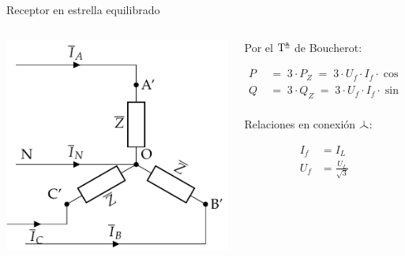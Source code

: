 \documentclass[aspectratio=169, usenames,svgnames,dvipsnames]{beamer}
\newcommand\wye{\scalerel*{\stackengine{-1pt}{%
  \rotatebox[origin=c]{30}{\rule{10pt}{.9pt}}\kern-1pt%
  \rotatebox[origin=c]{-30}{\rule{10pt}{1.3pt}}}{%
  \rule{.9pt}{10pt}}{O}{c}{F}{F}{S}}{\Delta}} %
\begin{document}

\begin{frame}{Receptor en estrella equilibrado}
    \begin{columns}
    \begin{column}{0.4\columnwidth}
        \includegraphics[width=1.05\linewidth]{../figs/EstrellaEquilibrado_Receptor.pdf}
    \end{column}
    
    \begin{column}{0.6\columnwidth}
        
        \vspace{3mm}
        Por el $\mbox{T}^{\textrm{\underline{a}}}$ de \alert{Boucherot}:

        \vspace{-6mm}
        \begin{align*}
            P &\;=\; 3 \cdot P_Z \;=\; 3 \cdot U_f\cdot I_f\cdot\cos(\theta)\\
            Q &\;=\; 3 \cdot Q_Z \;=\; 3 \cdot U_f\cdot I_f \cdot \sin(\theta)\\
        \end{align*}    
    
        \vspace{-5mm}
        Relaciones en conexión $\wye$:

        \vspace{-6mm}
        \begin{align*}
          I_f &= I_L\\
          U_f &= \frac{U_L}{\sqrt{3}}
        \end{align*}
    

\end{column}
\end{columns}
\end{frame}
\end{document}
